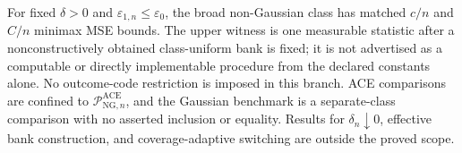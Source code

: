 For fixed \(\delta>0\) and \(\varepsilon_{1,n}\le\varepsilon_0\), the broad non-Gaussian class has matched \(c/n\) and \(C/n\) minimax MSE bounds.  The upper witness is one measurable statistic after a nonconstructively obtained class-uniform bank is fixed; it is not advertised as a computable or directly implementable procedure from the declared constants alone.  No outcome-code restriction is imposed in this branch.  ACE comparisons are confined to \(\mathcal P_{\mathrm{NG},n}^{\mathrm{ACE}}\), and the Gaussian benchmark is a separate-class comparison with no asserted inclusion or equality.  Results for \(\delta_n\downarrow0\), effective bank construction, and coverage-adaptive switching are outside the proved scope.
